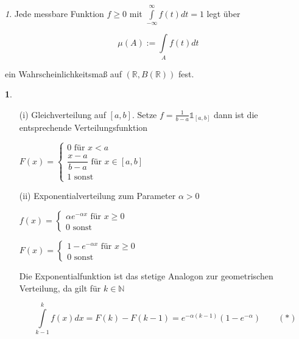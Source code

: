 \documentclass[10pt,a4paper]{report}
\newcommand{\N}{\mathbb{N}}
\newcommand{\R}{\mathbb{R}}
\numberwithin{equation}{section}
\numberwithin{figure}{section}
\theoremstyle{plain}
\theoremstyle{definition}
\newtheorem{example}[thm]{\protect\examplename}
\theoremstyle{remark}
\newtheorem{rem}[thm]{\protect\remarkname}
\theoremstyle{plain}
\providecommand{\examplename}{Beispiel}
\providecommand{\remarkname}{Bemerkung}
\newcommand{\1}{ \mathbb{1} } %
\begin{document}
\begin{rem}
  Jede messbare Funktion $f \geq 0$ mit $\int\limits_{-\infty}^\infty
  f(t)dt=1$ legt über
  \begin{center}
    \[\mu(A):=\int\limits_Af(t)dt\]
  \end{center}
  ein Wahrscheinlichkeitsmaß auf $(\R,B(\R))$ fest.
\end{rem}
\begin{example} \ 
  \begin{itemize}
  \item[(i)] Gleichverteilung auf $[a,b]$. Setze
    $f=\frac{1}{b-a}\1_[a,b]$ dann ist die entsprechende
    Verteilungsfunktion
    \begin{center}
      $F(x)=\begin{cases}
        0 \text{ für } x < a\\
        \dfrac{x-a}{b-a} \text{ für } x \in [a,b]\\
        1 \text{ sonst }
      \end{cases}$
    \end{center}
  \item[(ii)]  Exponentialverteilung zum Parameter $\alpha >0$
    \begin{center}
      $f(x)=\begin{cases}
        \alpha e^{-\alpha x} \text{ für } x \geq 0\\
        0 \text{ sonst }
      \end{cases}$
    \end{center}
    \begin{center}
      $F(x)=\begin{cases}
        1-e^{-\alpha x} \text{ für } x \geq 0\\
        0 \text{ sonst }
      \end{cases}$
    \end{center}
    Die Exponentialfunktion ist das stetige Analogon zur geometrischen
    Verteilung, da gilt für $k \in \N$

    \[ \int\limits_{k-1}^k
    f(x)dx=F(k)-F(k-1)=e^{-\alpha(k-1)}(1-e^{-\alpha}) \qquad (*)\]


\end{itemize}
\end{example}
\end{document}
